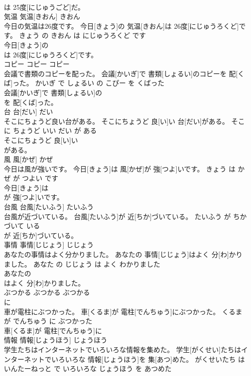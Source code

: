 \documentclass[8pt]{extreport}
\begin{document}
\begin{CJK}{UTF8}{min}
\\	は 25度[にじゅうごど]だ。		
\\	気温	気温[きおん]	きおん	
\\	今日の気温は26度です。	今日[きょう]の 気温[きおん]は 26度[にじゅうろくど]です。	きょう の きおん は にじゅうろくど です	
\\	今日[きょう]の
\\	は 26度[にじゅうろくど]です。		
\\	コピー	コピー	コピー	
\\	会議で書類のコピーを配った。	会議[かいぎ]で 書類[しょるい]のコピーを 配[くば]った。	かいぎ で しょるい の こぴー を くばった	
\\	会議[かいぎ]で 書類[しょるい]の
\\	を 配[くば]った。		
\\	台	台[だい]	だい	
\\	そこにちょうど良い台がある。	そこにちょうど 良[い]い 台[だい]がある。	そこ に ちょうど いい だい が ある	
\\	そこにちょうど 良[い]い
\\	がある。		
\\	風	風[かぜ]	かぜ	
\\	今日は風が強いです。	今日[きょう]は 風[かぜ]が 強[つよ]いです。	きょう は かぜ が つよい です	
\\	今日[きょう]は
\\	が 強[つよ]いです。		
\\	台風	台風[たいふう]	たいふう	
\\	台風が近づいている。	台風[たいふう]が 近[ちか]づいている。	たいふう が ちかづいて いる	
\\	が 近[ちか]づいている。		
\\	事情	事情[じじょう]	じじょう	
\\	あなたの事情はよく分かりました。	あなたの 事情[じじょう]はよく 分[わ]かりました。	あなた の じじょう は よく わかりました	
\\	あなたの
\\	はよく 分[わ]かりました。		
\\	ぶつかる	ぶつかる	ぶつかる	
\\	に		
\\	車が電柱にぶつかった。	車[くるま]が 電柱[でんちゅう]にぶつかった。	くるま が でんちゅう に ぶつかった	
\\	車[くるま]が 電柱[でんちゅう]に
\\	情報	情報[じょうほう]	じょうほう	
\\	学生たちはインターネットでいろいろな情報を集めた。	学生[がくせい]たちはインターネットでいろいろな 情報[じょうほう]を 集[あつ]めた。	がくせいたち は いんたーねっと で いろいろな じょうほう を あつめた	

\end{CJK}
\end{document}

